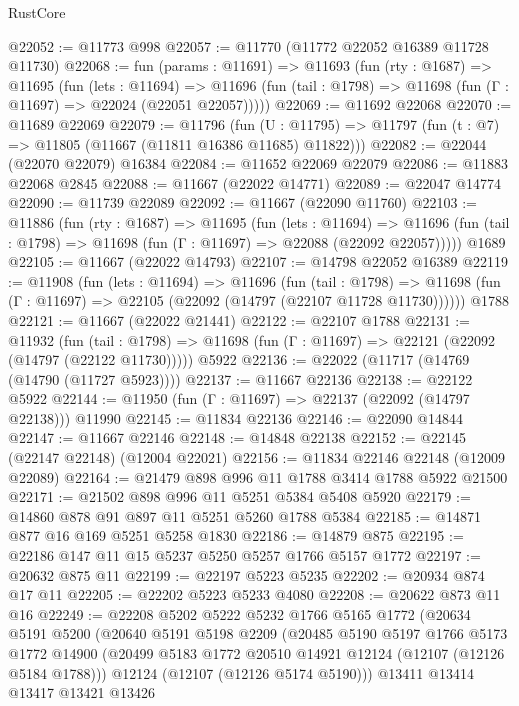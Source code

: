 \begin{lexlean}{RustCore}
\begin{coremodule}
@22052 := @11773 @998
@22057 := @11770 (@11772 @22052 @16389 @11728 @11730)
@22068 := fun (params : @11691) =>
  @11693
    (fun (rty : @1687) =>
    @11695
      (fun (lets : @11694) =>
      @11696 (fun (tail : @1798) => @11698 (fun (Γ : @11697) => @22024 (@22051 @22057)))))
@22069 := @11692 @22068
@22070 := @11689 @22069
@22079 := @11796
    (fun (U : @11795) => @11797 (fun (t : @7) => @11805 (@11667 (@11811 @16386 @11685) @11822)))
@22082 := @22044 (@22070 @22079) @16384
@22084 := @11652 @22069 @22079
@22086 := @11883 @22068 @2845
@22088 := @11667 (@22022 @14771)
@22089 := @22047 @14774
@22090 := @11739 @22089
@22092 := @11667 (@22090 @11760)
@22103 := @11886
    (fun (rty : @1687) =>
    @11695
      (fun (lets : @11694) =>
      @11696 (fun (tail : @1798) => @11698 (fun (Γ : @11697) => @22088 (@22092 @22057)))))
    @1689
@22105 := @11667 (@22022 @14793)
@22107 := @14798 @22052 @16389
@22119 := @11908
    (fun (lets : @11694) =>
    @11696
      (fun (tail : @1798) =>
      @11698 (fun (Γ : @11697) => @22105 (@22092 (@14797 (@22107 @11728 @11730))))))
    @1788
@22121 := @11667 (@22022 @21441)
@22122 := @22107 @1788
@22131 := @11932
    (fun (tail : @1798) => @11698 (fun (Γ : @11697) => @22121 (@22092 (@14797 (@22122 @11730)))))
    @5922
@22136 := @22022 (@11717 (@14769 (@14790 (@11727 @5923))))
@22137 := @11667 @22136
@22138 := @22122 @5922
@22144 := @11950 (fun (Γ : @11697) => @22137 (@22092 (@14797 @22138))) @11990
@22145 := @11834 @22136
@22146 := @22090 @14844
@22147 := @11667 @22146
@22148 := @14848 @22138
@22152 := @22145 (@22147 @22148) (@12004 @22021)
@22156 := @11834 @22146 @22148 (@12009 @22089)
@22164 := @21479 @898 @996 @11 @1788 @3414 @1788 @5922 @21500
@22171 := @21502 @898 @996 @11 @5251 @5384 @5408 @5920
@22179 := @14860 @878 @91 @897 @11 @5251 @5260 @1788 @5384
@22185 := @14871 @877 @16 @169 @5251 @5258 @1830
@22186 := @14879 @875
@22195 := @22186 @147 @11 @15 @5237 @5250 @5257 @1766 @5157 @1772
@22197 := @20632 @875 @11
@22199 := @22197 @5223 @5235
@22202 := @20934 @874 @17 @11
@22205 := @22202 @5223 @5233 @4080
@22208 := @20622 @873 @11 @16
@22249 := @22208
    @5202
    @5222
    @5232
    @1766
    @5165
    @1772
    (@20634
      @5191
      @5200
      (@20640
        @5191
        @5198
        @2209
        (@20485
          @5190
          @5197
          @1766
          @5173
          @1772
          @14900
          (@20499 @5183 @1772 @20510 @14921 @12124 (@12107 (@12126 @5184 @1788)))
          @12124
          (@12107 (@12126 @5174 @5190)))
        @13411
        @13414
        @13417
        @13421
        @13426

\end{coremodule}
\end{lexlean}
